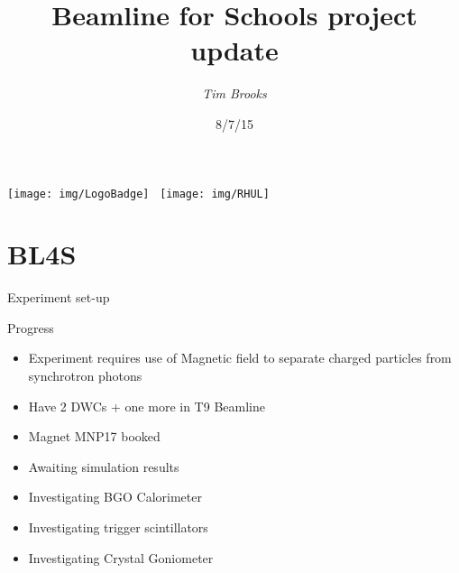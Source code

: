 \documentclass{beamer}
\title[Beamline for Schools\hspace{2em}\insertframenumber/
\inserttotalframenumber]{Beamline for Schools project update}
\author{\emph{Tim Brooks}}
\institute{CERN / RHUL}
\date{8/7/15}
\begin{document}
\begin{frame}
\titlepage{}
\centering
\texttt{[image: img/LogoBadge]}
\,
\texttt{[image: img/RHUL]}
\end{frame}

\section{BL4S}

\begin{frame}{Experiment set-up}
\begin{figure}\centering
    
\end{figure}
\end{frame}
{

}

\begin{frame}{Progress}
\begin{itemize}
\item Experiment requires use of Magnetic field to separate charged particles from synchrotron photons
\item Have 2 DWCs + one more in T9 Beamline
\item Magnet MNP17 booked
\item Awaiting simulation results
\item Investigating BGO Calorimeter
\item Investigating trigger scintillators
\item Investigating Crystal Goniometer
\end{itemize}
\end{frame}
\end{document}
